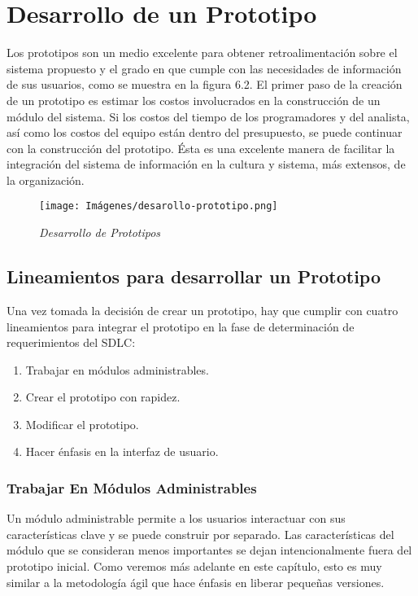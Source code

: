 \section{Desarrollo de un Prototipo}
Los prototipos son un medio excelente para obtener retroalimentación sobre el sistema propuesto y el grado en que cumple con las necesidades de información de sus usuarios, como se muestra en la figura 6.2. El primer paso de la creación de un prototipo es estimar los costos involucrados en la construcción de un módulo del sistema. Si los costos del tiempo de los programadores y del analista, así como los costos del equipo están dentro del presupuesto, se puede continuar con la construcción del prototipo. Ésta es una excelente manera de facilitar la integración del sistema de información en la cultura y sistema, más extensos, de la organización.

\begin{figure}[h!]
    \centering
    \texttt{[image: Imágenes/desarollo-prototipo.png]}
    \caption{\textit{Desarrollo de Prototipos}}
    \label{exemploLabel}
    \end{figure}
\subsection{Lineamientos para desarrollar un Prototipo}
Una vez tomada la decisión de crear un prototipo, hay que cumplir con cuatro lineamientos para integrar el prototipo en la fase de determinación de requerimientos del SDLC: 
\begin{enumerate}
\item Trabajar en módulos administrables. 
\item Crear el prototipo con rapidez. 
\item Modificar el prototipo.
\item Hacer énfasis en la interfaz de usuario. 
\end{enumerate}

\subsubsection{Trabajar En Módulos Administrables }
Un módulo administrable permite a los usuarios interactuar con sus características clave y se puede construir por separado. Las características del módulo que se consideran menos importantes se dejan intencionalmente fuera del prototipo inicial. Como veremos más adelante en este capítulo, esto es muy similar a la metodología ágil que hace énfasis en liberar pequeñas versiones. 

